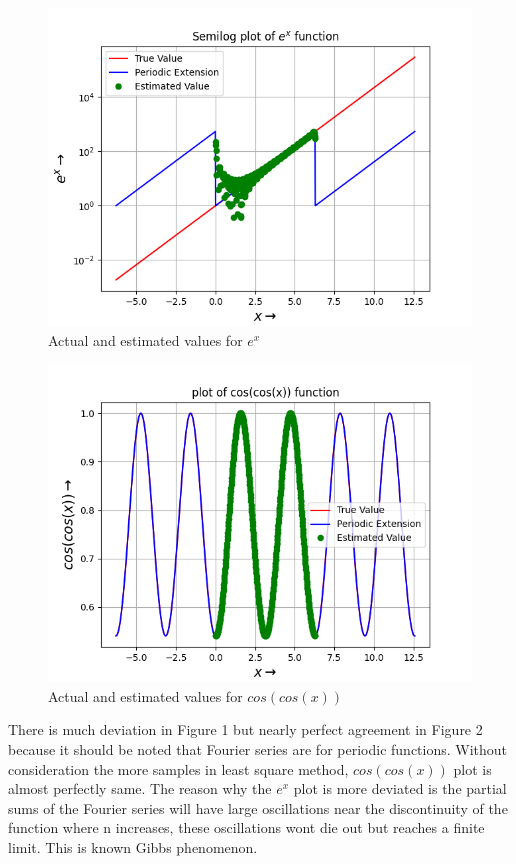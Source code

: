 \documentclass[11pt, a4paper]{article}
\begin{document}
 	\begin{figure}[!tbh]
   	\centering
   	\includegraphics[scale=0.6]{Ass4_Figure_11.png}   
   	\caption{Actual and estimated values for $e^{x}$}
   	\label{fig:sample}
   \end{figure} 
   
   \begin{figure}[!tbh]
   	\centering
   	\includegraphics[scale=0.6]{Ass4_Figure_12.png}   
   	\caption{Actual and estimated values for $cos(cos(x))$}
   	\label{fig:sample}
   \end{figure}
   \cleardoublepage
   There is much deviation in Figure 1 but nearly perfect agreement in Figure 2 because it should be noted that Fourier series are for periodic functions. Without consideration the more samples in least square method, $cos(cos(x))$ plot is almost perfectly same. The reason why the $e^x$ plot is more deviated is the partial sums of the Fourier series will have large oscillations near the discontinuity of the function where n increases, these oscillations wont die out but reaches a finite limit. This is known Gibbs phenomenon.
	
\end{document}
